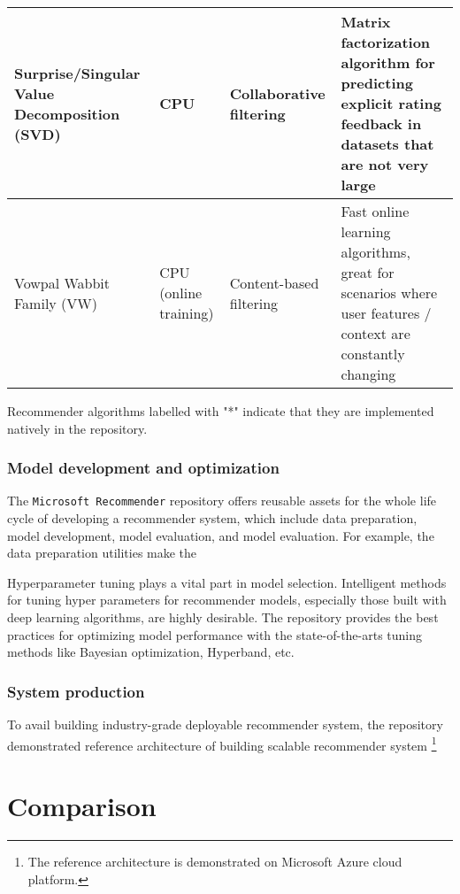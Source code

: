 \documentclass[twoside,11pt]{article}
\begin{document}
\begin{adjustbox}{angle=90}
\begin{threeparttable}
\begin{tabular}{|p{8cm}|p{3.5cm}|p{3.5cm}|p{6cm}|}
    \hline
    Surprise/Singular Value Decomposition (SVD) & CPU & Collaborative filtering & Matrix factorization algorithm for predicting explicit rating feedback in datasets that are not very large \\
    \hline
    Vowpal Wabbit Family (VW) & CPU (online training) & Content-based filtering & Fast online learning algorithms, great for scenarios where user features / context are constantly changing \\
    \hline
    \end{tabular}
    \begin{tablenotes}
      \scriptsize
      \item Recommender algorithms labelled with "*" indicate that they are implemented natively in the repository.
    \end{tablenotes}
  \end{threeparttable}
\end{adjustbox}

\subsubsection{Model development and optimization}
The \verb|Microsoft Recommender| repository offers reusable assets for the whole life cycle of developing a recommender system, which include data preparation, model development, model evaluation, and model evaluation. For example, the data preparation utilities make the  

Hyperparameter tuning plays a vital part in model selection. Intelligent methods for tuning hyper parameters for recommender models, especially those built with deep learning algorithms, are highly desirable. The repository provides the best practices for optimizing model performance with the state-of-the-arts tuning methods like Bayesian optimization, Hyperband, etc.

\subsubsection{System production}
To avail building industry-grade deployable recommender system, the repository demonstrated reference architecture of building scalable recommender system \footnote{The reference architecture is demonstrated on Microsoft Azure cloud platform.}

\section{Comparison}
\end{document}
